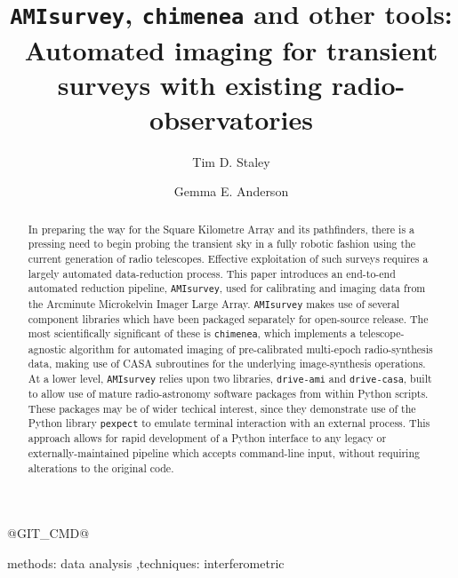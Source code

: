 \documentclass[5p,authoryear]{elsarticle}
\begin{document}
\newcommand{\code}[1]{\texttt{#1}}
\newcommand{\degrees}[1]{$#1^\circ$}

@GIT_CMD@

\begin{frontmatter}

\title{\texttt{AMIsurvey}, \texttt{chimenea} and other tools:\\ Automated imaging for transient surveys with existing radio-observatories }

\author[oxford]{Tim D. Staley}
\author[oxford]{Gemma E. Anderson}

\address[oxford]{Department of Physics, University of Oxford, Denys Wilkinson Building, Keble Road, Oxford, OX1 3RH, UK}

\begin{abstract}
In preparing the way for the Square Kilometre Array and its pathfinders, there is a pressing need to begin probing the transient sky in a fully robotic fashion using the current generation of radio telescopes. Effective exploitation of such surveys requires a largely automated data-reduction process.
This paper introduces an end-to-end automated reduction pipeline, \texttt{AMIsurvey}, used for calibrating and imaging data from the Arcminute Microkelvin Imager Large Array. 
\texttt{AMIsurvey} makes use of several component libraries which have been packaged separately for open-source release. 
The most scientifically significant of these is \texttt{chimenea}, which implements a telescope-agnostic algorithm for automated imaging of pre-calibrated multi-epoch radio-synthesis data, making use of CASA subroutines for the underlying image-synthesis operations.
At a lower level, \texttt{AMIsurvey} relies upon two libraries, \texttt{drive-ami} and \texttt{drive-casa}, built to allow use of mature radio-astronomy software packages from within Python scripts. 
These packages may be of wider techical interest, since they demonstrate use of the Python library \texttt{pexpect} to emulate terminal interaction with an external process. 
This approach allows for rapid development of a Python interface to any legacy or externally-maintained pipeline which accepts command-line input, without requiring alterations to the original code.



\end{abstract}

\begin{keyword}
methods: data analysis \sep  techniques: interferometric
\end{keyword}

\end{frontmatter}
\end{document}
